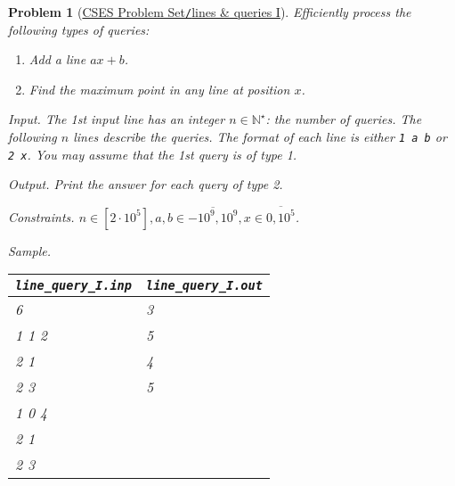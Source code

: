 \documentclass{article}
\newtheorem{problem}{Problem}
\begin{document}
\begin{problem}[\href{https://cses.fi/problemset/task/3429}{CSES Problem Set{\tt/}lines \& queries I}]
    Efficiently process the following types of queries:
    \begin{enumerate}
        \item Add a line $ax + b$.
        \item Find the maximum point in any line at position $x$.
    \end{enumerate}
    \item {\sf Input.} The 1st input line has an integer $n\in\mathbb{N}^\star$: the number of queries. The following $n$ lines describe the queries. The format of each line is either {\tt1 a b} or {\tt2 x}. You may assume that the 1st query is of type 1.
    \item {\sf Output.} Print the answer for each query of type 2.
    \item {\sf Constraints.} $n\in[2\cdot10^5],a,b\in\overline{-10^9,10^9},x\in\overline{0,10^5}$.
    \item {\sf Sample.}
    \begin{table}[H]
        \centering
        \begin{tabular}{|l|l|}
            \hline
            \verb|line_query_I.inp| & \verb|line_query_I.out| \\
            \hline
            6 & 3 \\
            1 1 2 & 5 \\
            2 1 & 4 \\
            2 3 & 5 \\
            1 0 4 & \\
            2 1 & \\
            2 3 & \\
            \hline
        \end{tabular}
    \end{table}
\end{problem}
\end{document}
